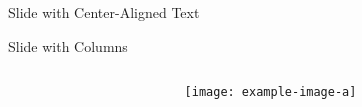 \begin{frame}{Slide with Center-Aligned Text}
  \lipsum[2]
\end{frame}
  
\begin{frame}[t]{Slide with Columns}

  \begin{minipage}[t][\textheight][t]{\linewidth}
    \begin{columns}
      \begin{column}[T]{0.48\textwidth}
        \lipsum[3][1-10]
      \end{column}
      \hfill
      \begin{column}[T]{0.48\textwidth}
        \lipsum[4][1]
        \begin{center}
          \texttt{[image: example-image-a]}
        \end{center}
        \lipsum[4][2-5]
      \end{column}
    \end{columns}
  \end{minipage}

\end{frame}


